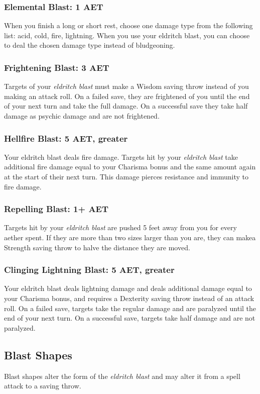 \subsubsection{Elemental Blast: 1 AET}
When you finish a long or short rest, choose one damage type from the following list: acid, cold, fire, lightning. When you use your eldritch blast, you can choose to deal the chosen damage type instead of bludgeoning.

\subsubsection{Frightening Blast: 3 AET}
Targets of your \textit{eldritch blast} must make a Wisdom saving throw instead of you making an attack roll. On a failed save, they are frightened of you until the end of your next turn and take the full damage. On a successful save they take half damage as psychic damage and are not frightened.

\subsubsection{Hellfire Blast: 5 AET, greater}
Your eldritch blast deals fire damage. Targets hit by your \textit{eldritch blast} take additional fire damage equal to your Charisma bonus and the same amount again at the start of their next turn. This damage pierces resistance and immunity to fire damage.

\subsubsection{Repelling Blast: 1+ AET}
Targets hit by your \textit{eldritch blast} are pushed 5 feet away from you for every aether spent. If they are more than two sizes larger than you are, they can makea Strength saving throw to halve the distance they are moved.

\subsubsection{Clinging Lightning Blast: 5 AET, greater}
Your eldritch blast deals lightning damage and deals additional damage equal to your Charisma bonus, and requires a Dexterity saving throw instead of an attack roll. On a failed save, targets take the regular damage and are paralyzed until the end of your next turn. On a successful save, targets take half damage and are not paralyzed.

\subsection{Blast Shapes}
Blast shapes alter the form of the \textit{eldritch blast} and may alter it from a spell attack to a saving throw.

